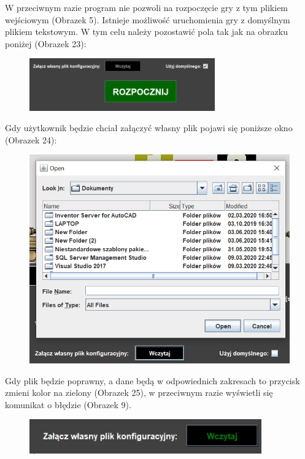 \documentclass{article}
\begin{document}
W przeciwnym razie program nie pozwoli na rozpoczęcie gry z tym plikiem wejściowym (Obrazek 5). Istnieje możliwość uruchomienia gry z domyślnym plikiem tekstowym. W tym celu należy pozostawić pola tak jak na obrazku poniżej 
(Obrazek 23):
\begin{figure} [hbt!]
    \centering
    \includegraphics[width=8cm]{wczyt_pliku_conf.png}
\end{figure}

\newpage
Gdy użytkownik będzie chciał załączyć własny plik pojawi się poniższe okno (Obrazek 24):
\begin{figure} [hbt!]
    \centering
    \includegraphics[width=12cm]{wczytanie.png}
\end{figure}


Gdy plik będzie poprawny, a dane będą w odpowiednich zakresach to przycisk zmieni kolor na zielony (Obrazek 25), w przeciwnym razie wyświetli się komunikat o błędzie (Obrazek 9).
\begin{figure} [hbt!]
    \centering
    \includegraphics[width=10cm]{wczytaj.png}
\end{figure}
\end{document}
